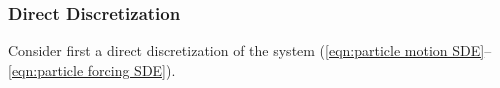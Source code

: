 \subsubsection{Direct Discretization}
    Consider first a direct discretization of the system (\ref{eqn:particle motion SDE}--\ref{eqn:particle forcing SDE}).


    
    
    